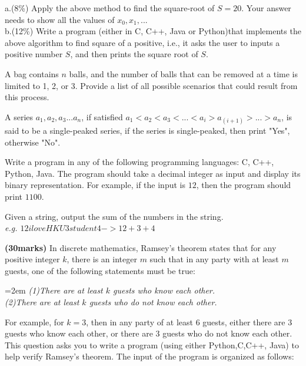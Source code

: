 \documentclass{article}
\begin{document}
\noindent a.(8\%) Apply the above method to find the square-root of $S=20$. Your answer needs to show all the values of $x_0, x_1, ...$\\
\noindent b.(12\%) Write a program (either in C, C++, Java or Python)that implements the above algorithm to find square of a positive, i.e., it asks the user to inputs a positive number $S$, and then prints the square root of $S$.

\vspace{2\baselineskip}

\noindent A bag contains $n$ balls, and the number of balls that can be removed at a time is limited to 1, 2, or 3. Provide a list of all possible scenarios that could result from this process.

\vspace{2\baselineskip}

\noindent A series $a_1, a_2, a_3...a_n$, if satisfied $a_1 < a_2 <a_3 <...< a_i > a_(i+1) > ... > a_n$, is said to be a single-peaked series, if the series is single-peaked, then print "Yes", otherwise "No".

\vspace{2\baselineskip}

\noindent Write a program in any of the following programming languages: C, C++, Python, Java. The program should take a decimal integer as input and display its binary representation. For example, if the input is $12$, then the program should print $1100$.

\vspace{2\baselineskip}

\noindent Given a string, output the sum of the numbers in the string.\\
\textit{\fontsize{9pt}{12pt}\selectfont e.g. $12iloveHKU3student4 -> 12+3+4$}

\vspace{2\baselineskip}

\noindent \textbf{(30marks)} In discrete mathematics, Ramsey's theorem states that for any positive integer $k$, there is an integer $m$ such that in any party with at least $m$ guests, one of the following statements must be true:

\hangindent=2em %
\textit{(1)There are at least $k$ guests who know each other.}\\
\textit{(2)There are at least $k$ guests who do not know each other.}

For example, for $k=3$, then in any party of at least 6 guests, either there are 3 guests who know each other, or there are 3 guests who do not know each other. This question asks you to write a program (using either Python,C,C++, Java) to help verify Ramsey's theorem. The input of the program is organized as follows:
\end{document}
